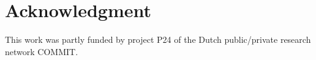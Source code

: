 \documentclass[10pt, a4paper, conference]{IEEEtran}
\begin{document}


\section*{Acknowledgment}
This work was partly funded by project P24 of the Dutch public/private research network COMMIT.





%






\end{document}
